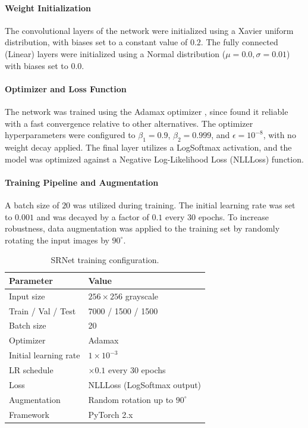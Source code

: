 \paragraph{Weight Initialization}
The convolutional layers of the network were initialized using a Xavier uniform distribution, with biases set to a constant value of $0.2$. 
The fully connected (Linear) layers were initialized using a Normal distribution ($\mu=0.0, \sigma=0.01$) with biases set to $0.0$.

\paragraph{Optimizer and Loss Function}
The network was trained using the Adamax optimizer \cite{Kingma2014}, since \textcite{Boroumand2019} found it reliable with a fast convergence relative to other alternatives. 
The optimizer hyperparameters were configured to $\beta_1 = 0.9$, $\beta_2 = 0.999$, and $\epsilon = 10^{-8}$, with no weight decay applied. 
The final layer utilizes a LogSoftmax activation, and the model was optimized against a Negative Log-Likelihood Loss (NLLLoss) function.

\paragraph{Training Pipeline and Augmentation}
A batch size of $20$ was utilized during training. 
The initial learning rate was set to $0.001$ and was decayed by a factor of $0.1$ every $30$ epochs. 
To increase robustness, data augmentation was applied to the training set by randomly rotating the input images by $90^\circ$.

\begin{table}[h]
  \centering
  \caption{SRNet training configuration.}
  \label{tab:cnn-hyperparams}
  \begin{tabular}{ll}
    \toprule
    \textbf{Parameter} & \textbf{Value} \\
    \midrule
    Input size              & $256 \times 256$ grayscale \\
    Train / Val / Test      & 7000 / 1500 / 1500 \\
    Batch size              & 20 \\
    Optimizer               & Adamax \\
    Initial learning rate   & $1 \times 10^{-3}$ \\
    LR schedule             & $\times 0.1$ every 30 epochs \\
    Loss                    & NLLLoss (LogSoftmax output) \\
    Augmentation            & Random rotation up to $90^\circ$ \\
    Framework               & PyTorch 2.x \\
    \bottomrule
  \end{tabular}
\end{table}

